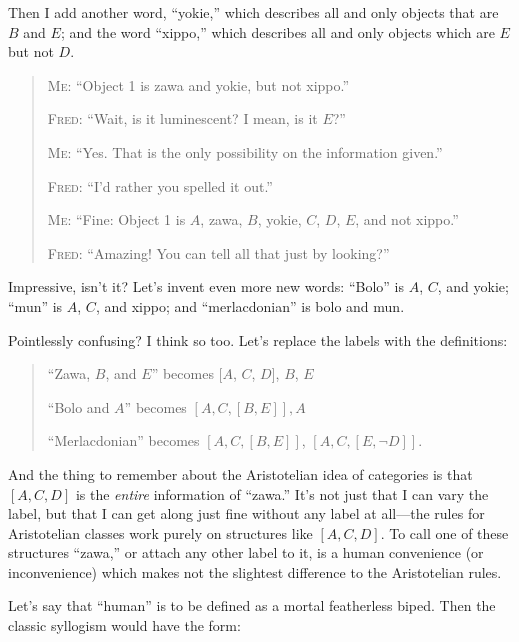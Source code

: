 { Then I add another word,
``yokie,'' which describes all and
only objects that are $B$ and $E$; and the word
``xippo,'' which describes all and
only objects which are $E$ but not $D$.

\begin{quotation}

 \textsc{Me}: ``Object 1 is zawa and yokie, but not
xippo.''


 \textsc{Fred}: ``Wait, is it luminescent? I mean, is it
$E$?''


 \textsc{Me}: ``Yes. That is the only possibility on the
information given.''


 \textsc{Fred}: ``I'd rather you spelled it
out.''


 \textsc{Me}: ``Fine: Object 1 is $A$, zawa, $B$, yokie, $C$, $D$,
$E$, and not xippo.''

{
 \textsc{Fred}: ``Amazing! You can tell all that just by
 looking?''}
\end{quotation}


 Impressive, isn't it? Let's invent
even more new words: ``Bolo'' is $A$,
$C$, and yokie; ``mun'' is $A$, $C$, and
xippo; and ``merlacdonian'' is bolo
and mun.


 Pointlessly confusing? I think so too. Let's
replace the labels with the definitions:

\begin{quotation}

 ``Zawa, $B$, and $E$'' becomes [$A$,
$C$, $D$], $B$, $E$


 ``Bolo and $A$'' becomes $[A, C,
[B, E]], A$

{
 ``Merlacdonian'' becomes $[A, C,
    [B, E]]$, $[A, C, [E, \lnot D]]$.}
\end{quotation}


 And the thing to remember about the Aristotelian idea of
categories is that $[A, C, D]$ is the \textit{entire} information of
``zawa.'' It's not
just that I can vary the label, but that I can get along just fine
without any label at all---the rules for Aristotelian classes work
purely on structures like $[A, C, D]$. To call one of these structures
``zawa,'' or attach any other label
to it, is a human convenience (or inconvenience) which makes not the
slightest difference to the Aristotelian rules.


 Let's say that
``human'' is to be defined as a
mortal featherless biped. Then the classic syllogism would have the
form:

\begin{quotation}


\end{quotation}}

